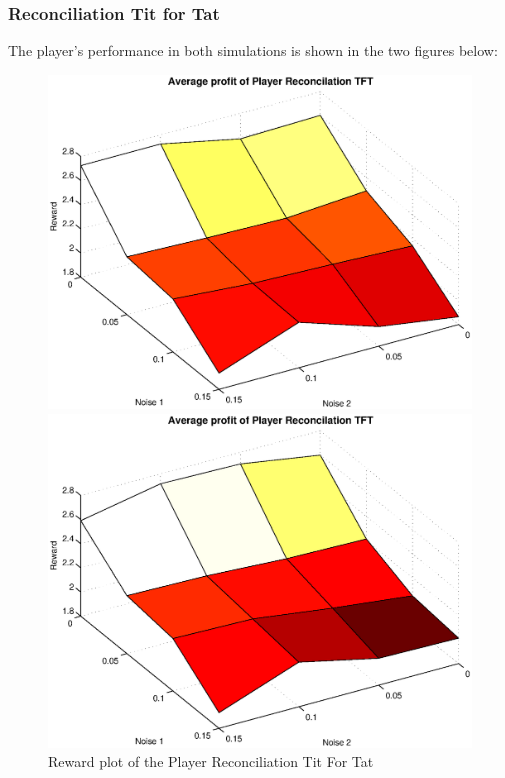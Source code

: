 \subsubsection{Reconciliation Tit for Tat}
The player's performance in both simulations is shown in the two figures below:
\begin{figure}[h]

\begin{minipage}[hbt]{0.65\textwidth}
	\centering
	\includegraphics[width=\textwidth]{pics/simulation1/Reward_vs_Noise_of_Player_Reconcilation_TFT}
\end{minipage}
\hfill
\begin{minipage}[hbt]{0.3\textwidth}
	\centering
	\includegraphics[width=\textwidth]{pics/simulation2/Reward_vs_Noise_of_Player_Reconcilation_TFT}
\end{minipage}
	\caption{Reward plot of the Player Reconciliation Tit For Tat}
	\label{pic player rtft}
\end{figure}

